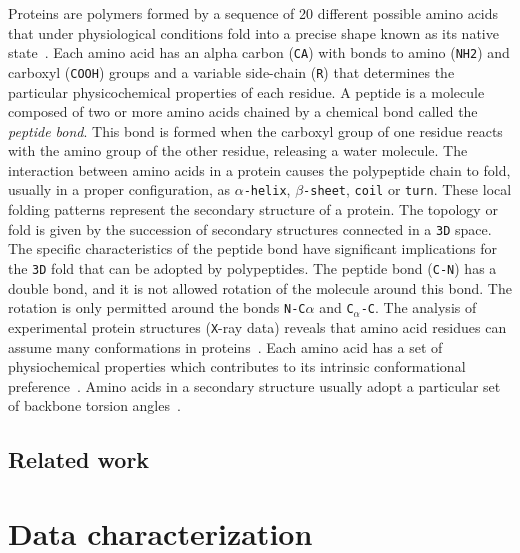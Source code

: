 \documentclass[10pt, conference]{IEEEtran}
\begin{document}
Proteins are polymers formed by a sequence of 20 different possible amino acids that under physiological conditions fold into a precise shape known as its native state~\cite{anfinsen:1973}. Each amino acid has an alpha carbon (\texttt{CA}) with bonds to amino (\texttt{NH2}) and carboxyl (\texttt{COOH}) groups and a variable side-chain (\texttt{R}) that determines the particular physicochemical properties of each residue. A peptide is a molecule composed of two or more amino acids chained by a chemical bond called the \textit{peptide bond}. This bond is formed when the carboxyl group of one residue reacts with the amino group of the other residue, releasing a water molecule. The interaction between amino acids in a protein causes the polypeptide chain to fold, usually in a proper configuration, as \texttt{$\alpha$-helix}, \texttt{$\beta$-sheet}, \texttt{coil} or \texttt{turn}. These local folding patterns represent the secondary structure of a protein. The topology or fold is given by the succession of secondary structures connected in a \texttt{3D} space. The specific characteristics of the peptide bond have significant implications for the \texttt{3D} fold that can be adopted by polypeptides. The peptide bond (\texttt{C-N}) has a double bond, and it is not allowed rotation of the molecule around this bond. The rotation is only permitted around the bonds \texttt{N-C$\alpha$} and \texttt{C}$_{\alpha}$\texttt{-C}. The analysis of experimental protein structures (\texttt{X}-ray data) reveals that amino acid residues can assume many conformations in proteins~\cite{Borguesan:2015}. Each amino acid has a set of physiochemical properties which contributes to its intrinsic conformational preference~\cite{Mathura:2005}. Amino acids in a secondary structure usually adopt a particular set of backbone torsion angles~\cite{Borguesan:2015}.

\subsection{Related work}
%


\section{Data characterization}
\end{document}
